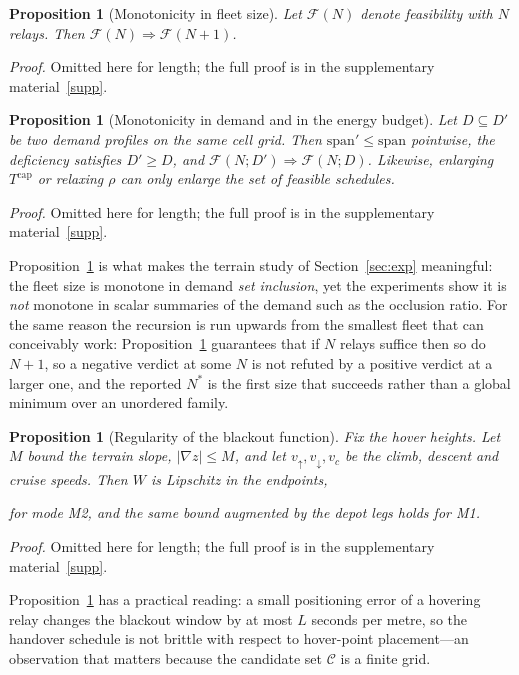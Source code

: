 \documentclass[11pt]{article}
\newcommand{\eqfit}[1]{%
  \par\nobreak
  \begin{center}%
  \resizebox{\ifdim\width>\linewidth\linewidth\else\width\fi}{!}{$\displaystyle #1$}%
  \end{center}%
  \par\nobreak
}
\theoremstyle{dshplain}
\newtheorem{proposition}[theorem]{Proposition}
\theoremstyle{dshdefn}
\begin{document}
\begin{proposition}[Monotonicity in fleet size]
\label{prop:monotone}
Let $\mathcal{F}(N)$ denote feasibility with $N$ relays. Then
$\mathcal{F}(N)\Rightarrow\mathcal{F}(N+1)$.
\end{proposition}
\noindent\emph{Proof.} Omitted here for length; the full proof is in the supplementary material~\ref{supp}.


\begin{proposition}[Monotonicity in demand and in the energy budget]
\label{prop:demand}
Let $D\subseteq D'$ be two demand profiles on the same cell grid. Then
$\mathrm{span}'\le\mathrm{span}$ pointwise, the deficiency satisfies
$D'\ge D$, and $\mathcal{F}(N;D')\Rightarrow\mathcal{F}(N;D)$. Likewise,
enlarging $T^{\mathrm{cap}}$ or relaxing $\rho$ can only enlarge the set of
feasible schedules.
\end{proposition}
\noindent\emph{Proof.} Omitted here for length; the full proof is in the supplementary material~\ref{supp}.


\noindent Proposition~\ref{prop:demand} is what makes the terrain study of
Section~\ref{sec:exp} meaningful: the fleet size is monotone in demand
\emph{set inclusion}, yet the experiments show it is \emph{not} monotone in
scalar summaries of the demand such as the occlusion ratio. For the same reason
the recursion is run upwards from the smallest fleet that can conceivably work:
Proposition~\ref{prop:monotone} guarantees that if $N$ relays suffice then so do
$N+1$, so a negative verdict at some $N$ is not refuted by a positive verdict at a
larger one, and the reported $N^{*}$ is the first size that succeeds rather than a
global minimum over an unordered family.

\begin{proposition}[Regularity of the blackout function]
\label{prop:lipschitz}
Fix the hover heights. Let $M$ bound the terrain slope, $|\nabla z|\le M$, and
let $v_{\uparrow},v_{\downarrow},v_{c}$ be the climb, descent and cruise speeds.
Then $W$ is Lipschitz in the endpoints,
\eqfit{
|W(a,b)-W(a',b')|\ \le\ L\bigl(|a-a'|+|b-b'|\bigr),\qquad
L=\Bigl(\tfrac{1}{v_{\uparrow}}+\tfrac{1}{v_{\downarrow}}\Bigr)(1+M)+\tfrac{1}{v_{c}},
}
for mode M2, and the same bound augmented by the depot legs holds for M1.
\end{proposition}
\noindent\emph{Proof.} Omitted here for length; the full proof is in the supplementary material~\ref{supp}.


\noindent Proposition~\ref{prop:lipschitz} has a practical reading: a small
positioning error of a hovering relay changes the blackout window by at most
$L$ seconds per metre, so the handover schedule is not brittle with respect to
hover-point placement---an observation that matters because the candidate set
$\mathcal{C}$ is a finite grid.
\end{document}
